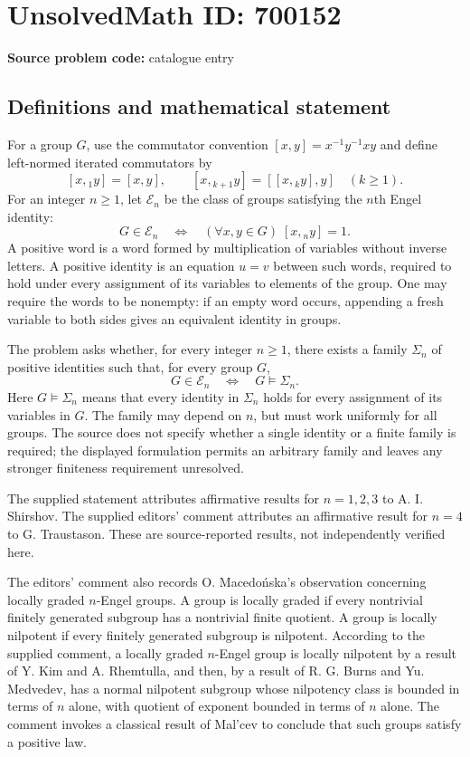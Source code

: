 \documentclass[11pt]{article}
\begin{document}
\section*{UnsolvedMath ID: 700152}
\textbf{Source problem code:} catalogue entry
\subsection{Definitions and mathematical statement}
For a group \(G\), use the commutator convention \([x,y]=x^{-1}y^{-1}xy\) and define left-normed iterated commutators by
\[
[x,{}_{1}y]=[x,y],\qquad [x,{}_{k+1}y]=[[x,{}_{k}y],y]\quad(k\geq 1).
\]
For an integer \(n\geq 1\), let \(\mathcal E_n\) be the class of groups satisfying the \(n\)th Engel identity:
\[
G\in\mathcal E_n\quad\Longleftrightarrow\quad
(\forall x,y\in G)\;[x,{}_{n}y]=1.
\]
A positive word is a word formed by multiplication of variables without inverse letters. A positive identity is an equation \(u=v\) between such words, required to hold under every assignment of its variables to elements of the group. One may require the words to be nonempty: if an empty word occurs, appending a fresh variable to both sides gives an equivalent identity in groups.

The problem asks whether, for every integer \(n\geq 1\), there exists a family \(\Sigma_n\) of positive identities such that, for every group \(G\),
\[
G\in\mathcal E_n
\quad\Longleftrightarrow\quad
G\models\Sigma_n.
\]
Here \(G\models\Sigma_n\) means that every identity in \(\Sigma_n\) holds for every assignment of its variables in \(G\). The family may depend on \(n\), but must work uniformly for all groups. The source does not specify whether a single identity or a finite family is required; the displayed formulation permits an arbitrary family and leaves any stronger finiteness requirement unresolved.

The supplied statement attributes affirmative results for \(n=1,2,3\) to A. I. Shirshov. The supplied editors' comment attributes an affirmative result for \(n=4\) to G. Traustason. These are source-reported results, not independently verified here.

The editors' comment also records O. Macedo\'{n}ska's observation concerning locally graded \(n\)-Engel groups. A group is locally graded if every nontrivial finitely generated subgroup has a nontrivial finite quotient. A group is locally nilpotent if every finitely generated subgroup is nilpotent. According to the supplied comment, a locally graded \(n\)-Engel group is locally nilpotent by a result of Y. Kim and A. Rhemtulla, and then, by a result of R. G. Burns and Yu. Medvedev, has a normal nilpotent subgroup whose nilpotency class is bounded in terms of \(n\) alone, with quotient of exponent bounded in terms of \(n\) alone. The comment invokes a classical result of Mal'cev to conclude that such groups satisfy a positive law.
\end{document}
